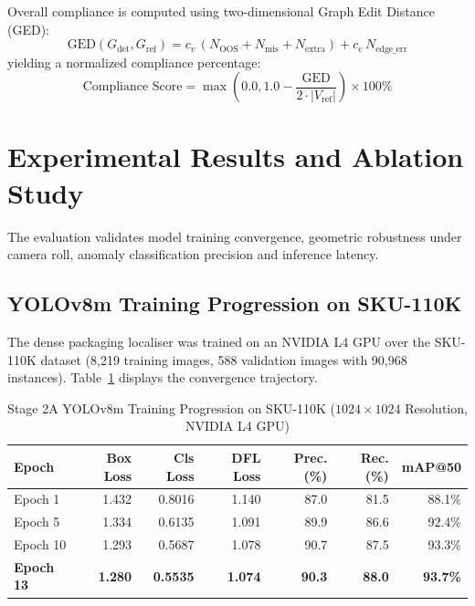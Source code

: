 \documentclass[conference]{IEEEtran}
\begin{document}
Overall compliance is computed using two-dimensional Graph Edit Distance (GED):
\begin{equation}
\text{GED}(G_{\text{det}}, G_{\text{ref}}) = c_v\,(N_{\text{OOS}} + N_{\text{mis}} + N_{\text{extra}}) + c_e\,N_{\text{edge\_err}}
\end{equation}
yielding a normalized compliance percentage:
\begin{equation}
\text{Compliance Score} = \max\left(0.0, 1.0 - \frac{\text{GED}}{2 \cdot |V_{\text{ref}}|}\right) \times 100\%
\end{equation}

\section{Experimental Results and Ablation Study}
The evaluation validates model training convergence, geometric robustness under camera roll, anomaly classification precision and inference latency.

\subsection{YOLOv8m Training Progression on SKU-110K}
The dense packaging localiser was trained on an NVIDIA L4 GPU over the SKU-110K dataset (8,219 training images, 588 validation images with 90,968 instances). Table~\ref{tab:yolo_training} displays the convergence trajectory.

\begin{table}[h]
\centering
\caption{Stage 2A YOLOv8m Training Progression on SKU-110K ($1024\times 1024$ Resolution, NVIDIA L4 GPU)}
\label{tab:yolo_training}
\scriptsize
\begin{tabularx}{\columnwidth}{l r r r r r r}
\toprule
\textbf{Epoch} & \textbf{Box Loss} & \textbf{Cls Loss} & \textbf{DFL Loss} & \textbf{Prec. (\%)} & \textbf{Rec. (\%)} & \textbf{mAP@50} \\
\midrule
Epoch 1  & 1.432 & 0.8016 & 1.140 & 87.0 & 81.5 & 88.1\% \\
Epoch 5  & 1.334 & 0.6135 & 1.091 & 89.9 & 86.6 & 92.4\% \\
Epoch 10 & 1.293 & 0.5687 & 1.078 & 90.7 & 87.5 & 93.3\% \\
\textbf{Epoch 13} & \textbf{1.280} & \textbf{0.5535} & \textbf{1.074} & \textbf{90.3} & \textbf{88.0} & \textbf{93.7\%} \\
\bottomrule
\end{tabularx}
\end{table}
\end{document}
